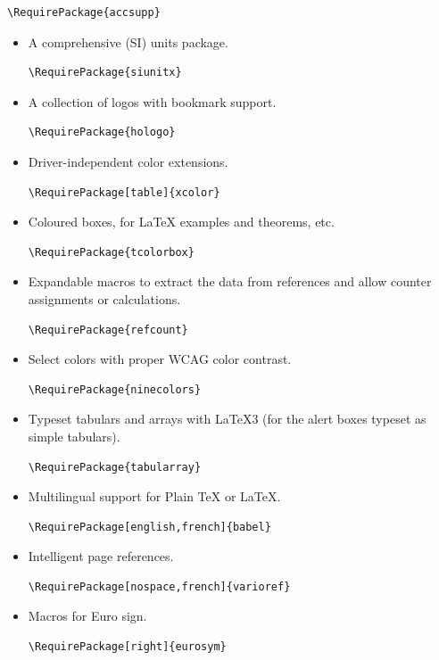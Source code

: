 \documentclass{letgut}
\begin{document}
\begin{lstlisting}
\RequirePackage{accsupp}
\end{lstlisting}
\begin{itemize}
\item A comprehensive (SI) units package.
\begin{lstlisting}
\RequirePackage{siunitx}
\end{lstlisting}
\item A collection of logos with bookmark support.
\begin{lstlisting}
\RequirePackage{hologo}
\end{lstlisting}
\item Driver-independent color extensions.
\begin{lstlisting}
\RequirePackage[table]{xcolor}
\end{lstlisting}
\item Coloured boxes, for \LaTeX{} examples and theorems, etc.
\begin{lstlisting}
\RequirePackage{tcolorbox}
\end{lstlisting}
\item Expandable macros to extract the data from references and allow counter
assignments or calculations.
\begin{lstlisting}
\RequirePackage{refcount}
\end{lstlisting}
\item Select colors with proper WCAG color contrast.
\begin{lstlisting}
\RequirePackage{ninecolors}
\end{lstlisting}
\item Typeset tabulars and arrays with LaTeX3 (for the alert boxes typeset as
simple tabulars).
\begin{lstlisting}
\RequirePackage{tabularray}
\end{lstlisting}
\item Multilingual support for Plain \TeX{} or \LaTeX{}.
\begin{lstlisting}
\RequirePackage[english,french]{babel}
\end{lstlisting}
\item Intelligent page references.
\begin{lstlisting}
\RequirePackage[nospace,french]{varioref}
\end{lstlisting}
\item Macros for Euro sign.
\begin{lstlisting}
\RequirePackage[right]{eurosym}
\end{lstlisting}

\end{itemize}
\end{document}
